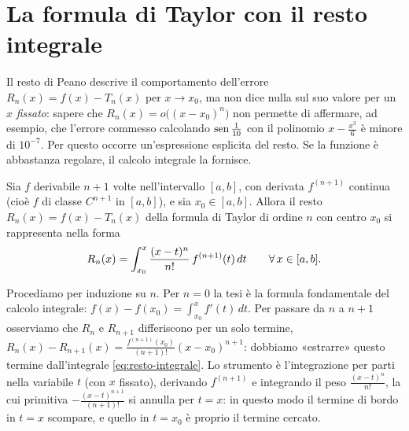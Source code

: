 \section{La formula di Taylor con il resto integrale}
\label{sec:resto-integrale}

Il resto di Peano descrive il comportamento dell'errore $R_{n}(x)=f(x)-T_{n}(x)$ per
$x\to x_{0}$, ma non dice nulla sul suo valore per un $x$ \emph{fissato}: sapere che
$R_{n}(x)=o\bigl((x-x_{0})^{n}\bigr)$ non permette di affermare, ad esempio, che l'errore
commesso calcolando $\operatorname{sen}\frac1{10}$ con il polinomio $x-\frac{x^{3}}6$ è minore di $10^{-7}$. Per
questo occorre un'espressione esplicita del resto. Se la funzione è abbastanza regolare,
il calcolo integrale la fornisce.

\begin{teorema}\label{teo:resto-integrale}
Sia $f$ derivabile $n+1$ volte nell'intervallo $[a,b]$, con derivata $f^{(n+1)}$ continua
(cioè $f$ di classe $C^{n+1}$ in $[a,b]$), e sia $x_{0}\in[a,b]$. Allora il resto
$R_{n}(x)=f(x)-T_{n}(x)$ della formula di Taylor di ordine $n$ con centro $x_{0}$ si
rappresenta nella forma
\begin{equation}\label{eq:resto-integrale}
  R_{n}(x)=\int_{x_{0}}^{x}\frac{(x-t)^{n}}{n!}\,f^{(n+1)}(t)\,dt \qquad\forall\, x\in[a,b] .
\end{equation}
\end{teorema}

\begin{schema}
\end{schema}

\begin{strategia}
Procediamo per induzione su $n$. Per $n=0$ la tesi è la formula fondamentale del calcolo
integrale: $f(x)-f(x_{0})=\int_{x_{0}}^{x}f'(t)\,dt$. Per passare da $n$ a $n+1$ osserviamo che
$R_{n}$ e $R_{n+1}$ differiscono per un solo termine,
$R_{n}(x)-R_{n+1}(x)=\frac{f^{(n+1)}(x_{0})}{(n+1)!}(x-x_{0})^{n+1}$: dobbiamo «estrarre» questo termine
dall'integrale \eqref{eq:resto-integrale}. Lo strumento è l'integrazione per parti nella
variabile $t$ (con $x$ fissato), derivando $f^{(n+1)}$ e integrando il peso
$\frac{(x-t)^{n}}{n!}$, la cui primitiva $-\frac{(x-t)^{n+1}}{(n+1)!}$ si annulla per $t=x$: in questo modo il
termine di bordo in $t=x$ scompare, e quello in $t=x_{0}$ è proprio il termine cercato.
\end{strategia}

